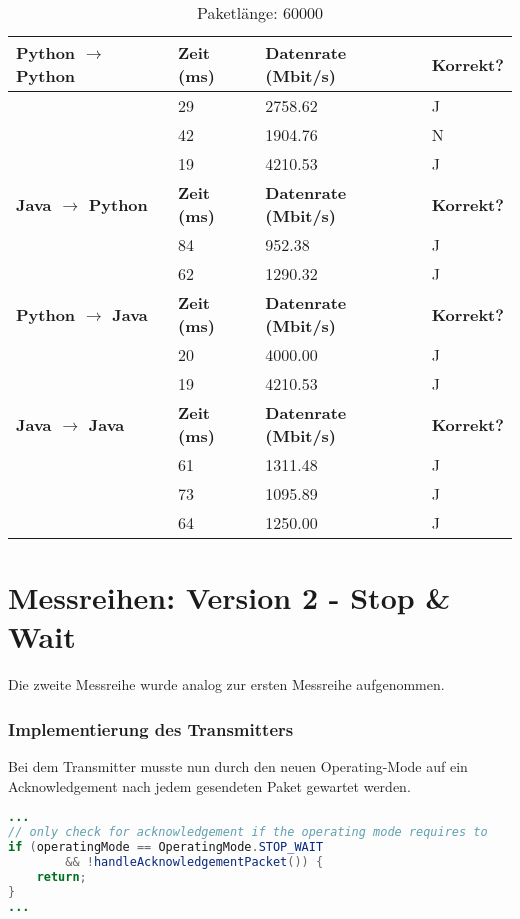 \documentclass{article}
\begin{document}
    \begin{table}[]
        \caption{Paketlänge: 60000}
        \label{tab:my-tablev1_60000}
        \begin{tabular}{|l|l|l|l|}
            \hline
            \textbf{Python $\rightarrow$ Python} & \textbf{Zeit (ms)} & \textbf{Datenrate (Mbit/s)} & \textbf{Korrekt?} \\ \hline
            & 29        & 2758.62            & J        \\ \cline{2-4}
            & 42        & 1904.76            & N        \\ \cline{2-4}
            & 19        & 4210.53            & J        \\ \hline
            \textbf{Java $\rightarrow$ Python}   & \textbf{Zeit (ms)} & \textbf{Datenrate (Mbit/s)} & \textbf{Korrekt?} \\ \hline
            & 84        & 952.38             & J        \\ \cline{2-4}
            & 62        & 1290.32            & J        \\ \hline
            \textbf{Python $\rightarrow$ Java}   & \textbf{Zeit (ms)} & \textbf{Datenrate (Mbit/s)} & \textbf{Korrekt?} \\ \hline
            & 20        & 4000.00            & J        \\ \cline{2-4}
            & 19        & 4210.53            & J        \\ \hline
            \textbf{Java $\rightarrow$ Java}    & \textbf{Zeit (ms)} & \textbf{Datenrate (Mbit/s)} & \textbf{Korrekt?} \\ \hline
            & 61        & 1311.48            & J        \\ \cline{2-4}
            & 73        & 1095.89            & J        \\ \cline{2-4}
            & 64        & 1250.00            & J        \\ \hline
        \end{tabular}
    \end{table}

    \pagebreak

    \section{Messreihen: Version 2 - Stop & Wait}
    Die zweite Messreihe wurde analog zur ersten Messreihe aufgenommen.\\

    \subsubsection*{Implementierung des Transmitters}
    Bei dem Transmitter musste nun durch den neuen Operating-Mode auf ein Acknowledgement nach jedem gesendeten
    Paket gewartet werden.\\
    \begin{lstlisting}[language=Java]
...
// only check for acknowledgement if the operating mode requires to
if (operatingMode == OperatingMode.STOP_WAIT
        && !handleAcknowledgementPacket()) {
    return;
}
...
    \end{lstlisting}
\end{document}
